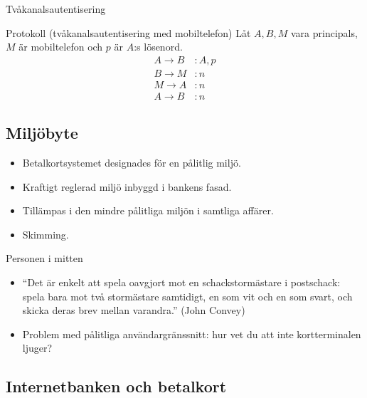 \documentclass{beamer}
\begin{document}
\begin{frame}{\insertsubsectionhead}{Tvåkanalsautentisering}
  \begin{block}{Protokoll (tvåkanalsautentisering med mobiltelefon)}
    Låt \(A, B, M\) vara principals, \(M\) är mobiltelefon och \(p\) är \(A\):s 
    lösenord.
    \begin{align*}
      A\to B &\colon A, p \\
      B\to M &\colon n \\
      M\to A &\colon n \\
      A\to B &\colon n
    \end{align*}
  \end{block}
\end{frame}

\subsection{Miljöbyte}

\begin{frame}{\insertsubsectionhead}
  \begin{itemize}
    \item Betalkortsystemet designades för en pålitlig miljö.
    \item Kraftigt reglerad miljö inbyggd i bankens fasad.
    \item Tillämpas i den mindre pålitliga miljön i samtliga affärer.
    \item Skimming.
  \end{itemize}
\end{frame}

\begin{frame}{\insertsubsectionhead}{Personen i mitten}
  \begin{itemize}
    \item \enquote{Det är enkelt att spela oavgjort mot en schackstormästare 
        i postschack: spela bara mot två stormästare samtidigt, en som vit och 
        en som svart, och skicka deras brev mellan varandra.} (John Convey)
    \item Problem med pålitliga användargränssnitt: hur vet du att inte 
      kortterminalen ljuger?
  \end{itemize}
\end{frame}

\subsection{Internetbanken och betalkort}
\end{document}
